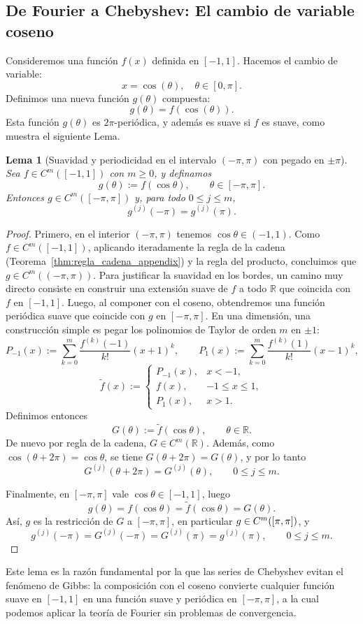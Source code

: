 \documentclass[a4paper,11pt]{report}
\newtheorem{lemma}[theorem]{Lema}
\begin{document}
\subsection{De Fourier a Chebyshev: El cambio de variable coseno}

Consideremos una función $f(x)$ definida en $[-1,1]$. Hacemos el cambio de variable:
\[
x = \cos(\theta), \quad \theta \in [0, \pi].
\]
Definimos una nueva función $g(\theta)$ compuesta:
\[
g(\theta) = f(\cos(\theta)).
\]
Esta función $g(\theta)$ es $2\pi$-periódica, y además es suave si $f$ es suave, como muestra el siguiente Lema.

\begin{lemma}[Suavidad y periodicidad en el intervalo $(-\pi,\pi)$ con pegado en $\pm\pi$]\label{lem:suavidad_chebyshev}
Sea $f \in C^m([-1,1])$ con $m \geq 0$, y definamos
\[
g(\theta):=f(\cos\theta),\qquad \theta\in[-\pi,\pi].
\]
Entonces $g\in C^m([-\pi,\pi])$ y, para todo $0\le j\le m$,
\[
g^{(j)}(-\pi)=g^{(j)}(\pi).
\]
\end{lemma}

\begin{proof}
Primero, en el interior $(-\pi,\pi)$ tenemos $\cos\theta\in(-1,1)$. Como $f\in C^m([-1,1])$, aplicando iteradamente la regla de la cadena (Teorema~\ref{thm:regla_cadena_appendix}) y la regla del producto, concluimos que $g\in C^m((-\pi,\pi))$. Para justificar la suavidad en los bordes, un camino muy directo consiste en construir una extensión suave de $f$ a todo $\mathbb{R}$ que coincida con $f$ en $[-1,1]$. Luego, al componer con el coseno, obtendremos una función periódica suave que coincide con $g$ en $[-\pi,\pi]$. En una dimensión, una construcción simple es pegar los polinomios de Taylor de orden $m$ en $\pm1$:
\[
P_{-1}(x):=\sum_{k=0}^m \frac{f^{(k)}(-1)}{k!}(x+1)^k,
\qquad
P_1(x):=\sum_{k=0}^m \frac{f^{(k)}(1)}{k!}(x-1)^k,
\]
\[
\tilde f(x):=
\begin{cases}
P_{-1}(x), & x<-1,\\
f(x), & -1\le x\le 1,\\
P_1(x), & x>1.
\end{cases}
\]
Definimos entonces
\[
G(\theta):=\tilde f(\cos\theta),\qquad \theta\in\mathbb R.
\]
De nuevo por regla de la cadena, $G\in C^m(\mathbb R)$. Además, como $\cos(\theta+2\pi)=\cos\theta$, se tiene $G(\theta+2\pi)=G(\theta)$, y por lo tanto
\[
G^{(j)}(\theta+2\pi)=G^{(j)}(\theta),\qquad 0\le j\le m.
\]

Finalmente, en $[-\pi,\pi]$ vale $\cos\theta\in[-1,1]$, luego
\[
g(\theta)=f(\cos\theta)=\tilde f(\cos\theta)=G(\theta).
\]
Así, $g$ es la restricción de $G$ a $[-\pi,\pi]$, en particular $g\in C^m([\-\pi,\pi])$, y
\[
g^{(j)}(-\pi)=G^{(j)}(-\pi)=G^{(j)}(\pi)=g^{(j)}(\pi),\qquad 0\le j\le m.
\]
\end{proof}
Este lema es la razón fundamental por la que las series de Chebyshev evitan el fenómeno de Gibbs: la composición con el coseno convierte cualquier función suave en $[-1,1]$ en una función suave y periódica en $[-\pi,\pi]$, a la cual podemos aplicar la teoría de Fourier sin problemas de convergencia.
\end{document}

